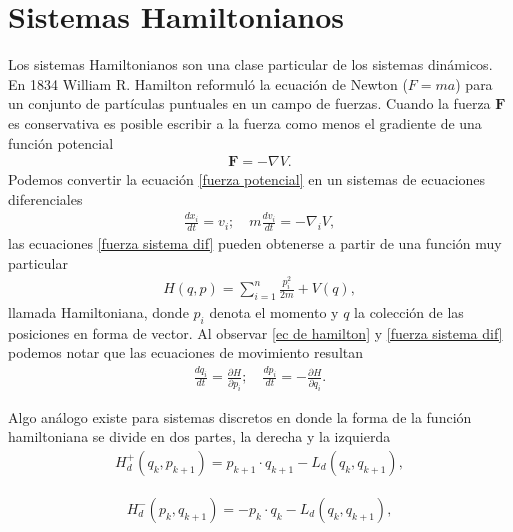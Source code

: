 \section{Sistemas Hamiltonianos}
Los sistemas Hamiltonianos son una clase particular de los sistemas dinámicos. En 1834 William R. Hamilton reformuló la ecuación de Newton ($F=ma$) para un conjunto de partículas puntuales en un campo de fuerzas. Cuando la fuerza $\mathbf{F}$ es conservativa es posible escribir a la fuerza como  menos el gradiente de una función potencial
\begin{eqnarray}
\mathbf{F}=-\nabla V. \label{fuerza potencial}
\end{eqnarray}
Podemos convertir la ecuación \ref{fuerza potencial} en un sistemas de ecuaciones diferenciales
\begin{eqnarray}
\frac{dx_{i}}{dt}=v_{i};   \quad m\frac{dv_{i}}{dt}=-\nabla_{i} V,
\label{fuerza sistema dif}
\end{eqnarray}
las ecuaciones \ref{fuerza sistema dif} pueden obtenerse a partir de una función muy particular
\begin{eqnarray}
H(q,p)=\sum_{i=1}^{n} \frac{p_{i}^{2}}{2m}+V(q), \label{ec de hamilton} 
\end{eqnarray}
llamada Hamiltoniana, donde $p_{i}$ denota el momento y \textbf{$q$} la colección de las posiciones en forma de vector. Al observar \ref{ec de hamilton} y \ref{fuerza sistema dif} podemos notar que las ecuaciones de movimiento resultan
\begin{eqnarray}
\frac{dq_{i}}{dt}=\frac{\partial H}{\partial p_{i}}; \quad
\frac{dp_{i}}{dt}=-\frac{\partial H}{\partial q_{i}}.
\label{ec de mov hamilton}
\end{eqnarray}

Algo análogo existe para sistemas discretos en donde la forma de la función hamiltoniana se divide en dos partes, la derecha y la izquierda \cite{Tomoki}
\begin{eqnarray}
H_{d}^{+}(q_{k},p_{k+1})=p_{k+1}\cdot q_{k+1}-L_{d}(q_{k},q_{k+1}),
\label{hamiltoniano discreto derecho}
\end{eqnarray}

\begin{eqnarray}
H_{d}^{-}(p_{k},q_{k+1})=-p_{k}\cdot q_{k}-L_{d}(q_{k},q_{k+1}),
\label{hamiltoniano discreto izquierdo}
\end{eqnarray}


